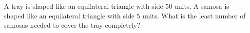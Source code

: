 A tray is shaped like an equilateral triangle with side $50$ units. A samosa is shaped like an equilateral triangle with side $5$ units. What is the least number of samosas needed to cover the tray completely?
